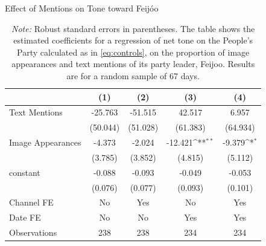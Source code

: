 \documentclass[12pt]{article}
\begin{document}
	
	\begin{table}[!htb]\centering
		\def\sym#1{\ifmmode^{#1}\else\(^{#1}\)\fi}
		\caption{Effect of Mentions on Tone toward Feijóo}
		\begin{tabular}{l*{4}{c}}
			\hline\hline
			&\multicolumn{1}{c}{(1)}         &\multicolumn{1}{c}{(2)}         &\multicolumn{1}{c}{(3)}         &\multicolumn{1}{c}{(4)}         \\
			\hline
			Text Mentions   &  -25.763         &  -51.515         &   42.517         &    6.957         \\
			& (50.044)         & (51.028)         & (61.383)         & (64.934)         \\
			Image Appearances  &   -4.373         &   -2.024         &  -12.421\sym{**} &   -9.379\sym{*}  \\
			&  (3.785)         &  (3.852)         &  (4.815)         &  (5.112)         \\
			constant          &   -0.088         &   -0.093         &   -0.049         &   -0.053         \\
			&  (0.076)         &  (0.077)         &  (0.093)         &  (0.101)         \\
			Channel FE      &       No         &      Yes         &       No         &      Yes         \\
			Date FE         &       No         &       No         &      Yes         &      Yes         \\
			\hline
			Observations    &      238         &      238         &      234         &      234         \\
			\hline\hline
		\end{tabular}
		\label{tab:feijoo_images}
		\vspace{0.5em}
		\caption*{\scriptsize\emph{Note:} Robust standard errors in parentheses. The table shows the estimated coefficients for a regression of net tone on the People's Party calculated as in \ref{eq:controls}, on the proportion of image appearances and text mentions of its party leader, Feijoo. Results are for a random sample of 67 days. }
	\end{table}
	
\end{document}
